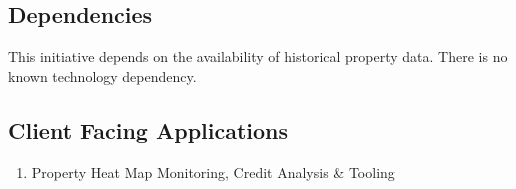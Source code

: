 \documentclass[]{article}
\begin{document}
\subsection{Dependencies}

This initiative depends on the availability of historical property data. There 
is no known technology dependency.

\subsection{Client Facing Applications}
\begin{enumerate}
    \item Property Heat Map \textrightarrow Monitoring, Credit Analysis \& 
    Tooling
\end{enumerate}

\newpage





\end{document}
